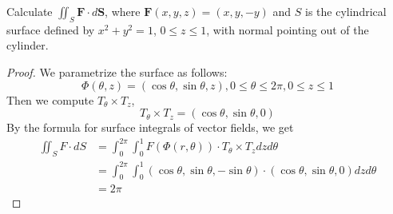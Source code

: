 \documentclass[openany]{book}
\begin{document}
\begin{prob}[26]
    Calculate \( \iint_S \mathbf{F} \cdot d\mathbf{S} \), where \( \mathbf{F}(x, y, z) = (x, y, -y) \) and \( S \) is the cylindrical surface defined by \( x^2 + y^2 = 1 \), \( 0 \leq z \leq 1 \), with normal pointing out of the cylinder.
\end{prob}
\begin{proof}
    We parametrize the surface as follows:
    \begin{equation*}
        \Phi(\theta,z)=(\cos\theta, \sin\theta, z), 0\leq\theta\leq 2\pi, 0\leq z\leq 1
    \end{equation*}
    Then we compute $T_\theta\times T_z$,
    \begin{equation*}
        T_\theta\times T_z=(\cos\theta, \sin\theta, 0)
    \end{equation*}
    By the formula for surface integrals of vector fields, we get 
    \begin{align*}
        \iint_SF\cdot dS&=\int_0^{2\pi}\int_0^1F(\Phi(r,\theta))\cdot T_\theta\times T_z dzd\theta\\
        &=\int_0^{2\pi}\int_0^1(\cos\theta, \sin\theta, -\sin\theta)\cdot(\cos\theta, \sin\theta, 0)dzd\theta\\
        &=2\pi
    \end{align*}
\end{proof}
\end{document}
